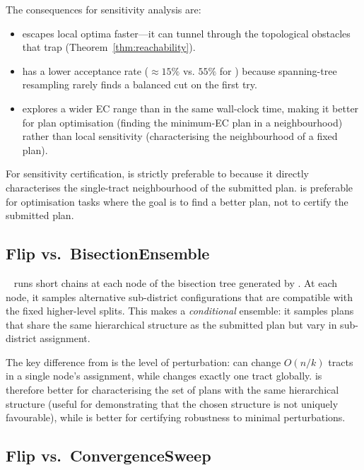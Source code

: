 The consequences for sensitivity analysis are:
\begin{itemize}
  \item \sburst{} escapes local optima faster---it can tunnel through the
        topological obstacles that trap \flip{} (Theorem~\ref{thm:reachability}).
  \item \sburst{} has a lower acceptance rate ($\approx\!15\%$ vs. $55\%$ for
        \flip{}) because spanning-tree resampling rarely finds a balanced cut
        on the first try.
  \item \sburst{} explores a wider EC range than \flip{} in the same wall-clock
        time, making it better for plan optimisation (finding the minimum-EC
        plan in a neighbourhood) rather than local sensitivity (characterising
        the neighbourhood of a fixed plan).
\end{itemize}

For sensitivity certification, \flip{} is strictly preferable to \sburst{} because
it directly characterises the single-tract neighbourhood of the submitted plan.
\sburst{} is preferable for optimisation tasks where the goal is to find a better
plan, not to certify the submitted plan.

\subsection{Flip vs.\ BisectionEnsemble}

\be{}~\citep{h1paper} runs short \recom{} chains at each node of the
bisection tree generated by \cs{}.
At each node, it samples alternative sub-district configurations that are
compatible with the fixed higher-level splits.
This makes \be{} a \emph{conditional} ensemble: it samples plans that share
the same hierarchical structure as the submitted plan but vary in sub-district
assignment.

The key difference from \flip{} is the level of perturbation:
\be{} can change $O(n/k)$ tracts in a single node's assignment, while
\flip{} changes exactly one tract globally.
\be{} is therefore better for characterising the set of plans with the same
hierarchical structure (useful for demonstrating that the chosen structure is
not uniquely favourable), while \flip{} is better for certifying robustness
to minimal perturbations.

\subsection{Flip vs.\ ConvergenceSweep}

